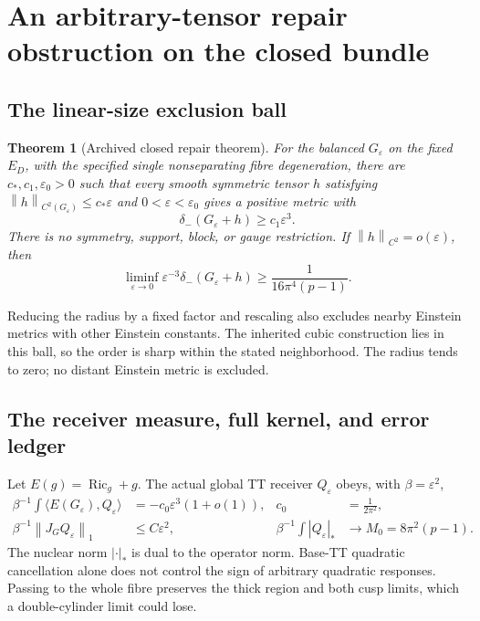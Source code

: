 \documentclass[a4paper,11pt]{article}
\newtheorem{theorem}{Theorem}[section]
\theoremstyle{definition}
\DeclareMathOperator{\Ric}{Ric}\DeclareMathOperator{\Rm}{Rm}
\newcommand{\norm}[1]{\left\lVert#1\right\rVert}
\begin{document}
\section{An arbitrary-tensor repair obstruction on the closed bundle}
\label{sec:closed-repair}
\subsection{The linear-size exclusion ball}\label{sec:exclusion}
\begin{theorem}[Archived closed repair theorem]\label{thm:exclusion}
For the balanced $G_\varepsilon$ on the fixed $E_D$, with the specified
single nonseparating fibre degeneration, there are $c_*,c_1,\varepsilon_0>0$
such that every smooth symmetric tensor $h$ satisfying
$\norm h_{C^2(G_\varepsilon)}\le c_*\varepsilon$ and
$0<\varepsilon<\varepsilon_0$ gives a positive metric with
\[
                \delta_-(G_\varepsilon+h)\ge c_1\varepsilon^3.
\]
There is no symmetry, support, block, or gauge restriction. If
$\norm h_{C^2}=o(\varepsilon)$, then
\[
\liminf_{\varepsilon\to0}\varepsilon^{-3}
\delta_-(G_\varepsilon+h)\ge\frac1{16\pi^4(p-1)}.
\]
\end{theorem}
Reducing the radius by a fixed factor and rescaling also excludes nearby
Einstein metrics with other Einstein constants. The inherited cubic
construction lies in this ball, so the order is sharp within the stated
neighborhood. The radius tends to zero; no distant Einstein metric is
excluded.

\subsection{The receiver measure, full kernel, and error ledger}\label{sec:weighted}
Let $E(g)=\Ric_g+g$. The actual global TT receiver $Q_\varepsilon$
obeys, with $\beta=\varepsilon^2$,
\begin{align}
\beta^{-1}\int\langle E(G_\varepsilon),Q_\varepsilon\rangle
 &=-c_0\varepsilon^3(1+o(1)),&c_0&=\frac1{2\pi^2},\\
\beta^{-1}\norm{J_GQ_\varepsilon}_1&\le C\varepsilon^2,&
\beta^{-1}\int|Q_\varepsilon|_*&\longrightarrow M_0=8\pi^2(p-1).
\end{align}
The nuclear norm $|\cdot|_*$ is dual to the operator norm.
Base-TT quadratic cancellation alone does not control the sign of
arbitrary quadratic responses. Passing to the whole fibre preserves the
thick region and both cusp limits, which a double-cylinder limit could lose.
\end{document}
